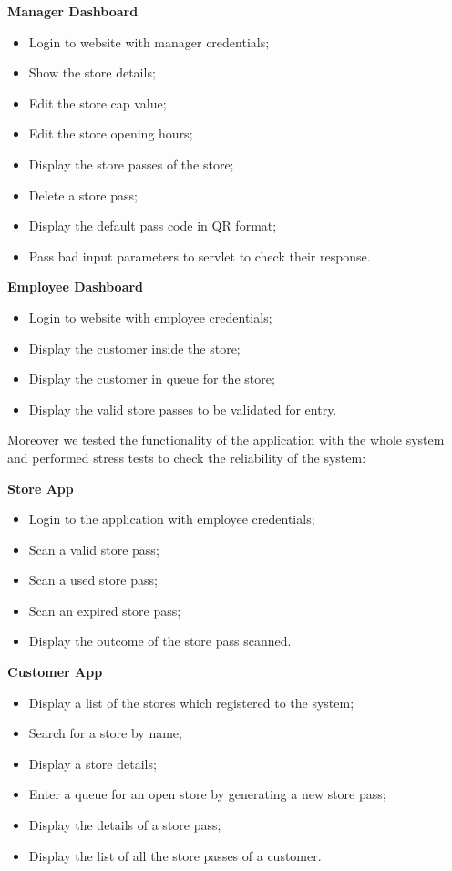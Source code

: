 \textbf{Manager Dashboard}
\begin{itemize}
	\item Login to website with manager credentials;
	\item Show the store details;
	\item Edit the store cap value;
	\item Edit the store opening hours;
	\item Display the store passes of the store;
	\item Delete a store pass;
	\item Display the default pass code in QR format;
	\item Pass bad input parameters to servlet to check their response.
\end{itemize}

\textbf{Employee Dashboard}
\begin{itemize}
	\item Login to website with employee credentials;
	\item Display the customer inside the store;
	\item Display the customer in queue for the store;
	\item Display the valid store passes to be validated for entry.
\end{itemize}
 
Moreover we tested the functionality of the application with the whole system and performed stress tests to check the reliability of the system:

\textbf{Store App}
\begin{itemize}
	\item Login to the application with employee credentials;
	\item Scan a valid store pass;
	\item Scan a used store pass;
	\item Scan an expired store pass;
	\item Display the outcome of the store pass scanned.
\end{itemize}

\textbf{Customer App}
\begin{itemize}
	\item Display a list of the stores which registered to the system;
	\item Search for a store by name;
	\item Display a store details;
	\item Enter a queue for an open store by generating a new store pass;
	\item Display the details of a store pass;
	\item Display the list of all the store passes of a customer.
\end{itemize}

